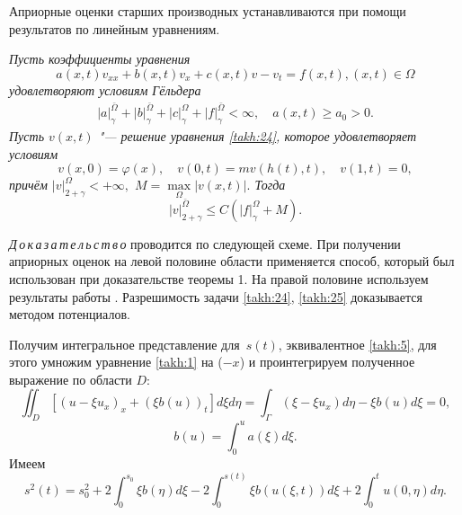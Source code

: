 \smallskip

Априорные оценки старших производных устанавливаются при помощи
результатов по линейным уравнениям.

\begin{theorem}[2]\sl Пусть коэффициенты уравнения
\begin{equation}
a(x,t)v_{xx}+b(x,t)v_x+c(x,t)v-v_t=f(x,t), (x,t)\in
\Omega
\label{takh:24}
\end{equation}
удовлетворяют условиям Гёльдера
\begin{gather*}
|a|^{\bar{\Omega}}_{\gamma}+|b|^{\bar{\Omega}}_{\gamma}+|c|^{\Omega}_{\gamma}+|f|^{\bar{\Omega}}_{\gamma}<\infty,
\quad 
a(x,t)\geq a_0>0.
\end{gather*}
Пусть $v(x,t)$ "--- решение уравнения \eqref{takh:24}{\rm ,} которое
 удовлетворяет условиям
\begin{equation}
v(x, 0)=\varphi(x),\quad v(0,t)=mv(h(t),t),\quad v(1, t)=0,
\label{takh:25}
\end{equation}
причём $|v|^{\Omega}_{2+\gamma}<+\infty,$ $M=\max\limits_{\Omega}|v(x,t)|.$
Тогда
\begin{equation}
|v|^{\bar{\Omega}}_{2+\gamma}\leq C(|f|^{\Omega}_{\gamma}+M).
\label{takh:26}
\end{equation}
\end{theorem}

\smallskip

\textit{Д\,о\,к\,а\,з\,а\,т\,е\,л\,ь\,с\,т\,в\,о\/} проводится по следующей схеме. При получении
априорных оценок на левой половине области применяется способ,
который был использован при доказательстве теоремы 1. На правой
половине используем результаты работы \cite{takh:bib:2}. Разрешимость задачи
\eqref{takh:24}, \eqref{takh:25} доказывается методом потенциалов.

\smallskip

Получим интегральное представление для~$s(t)$, эквивалентное \eqref{takh:5}, для этого умножим уравнение \eqref{takh:1} на ($-x$) и проинтегрируем  полученное
выражение по области $D$:
\begin{equation}
\iint_{D}[(u-\xi u_{x})_x+(\xi b(u))_t]d\xi d\eta =\int_{\Gamma}(\xi-\xi u_x)d\eta-\xi b(u)d\xi=0,
\label{takh:27}
\end{equation}
$$
b(u)=\int^{u}_{0}a(\xi)d\xi.
$$
Имеем
\begin{equation}
s^2(t)=s^{2}_{0}+2\int^{s_0}_{0}\xi b(\eta)d\xi-2\int^{s(t)}_{0}\xi
b(u(\xi,t))d\xi+2\int^{t}_{0}u(0,\eta)d\eta.
\label{takh:28}
\end{equation}

